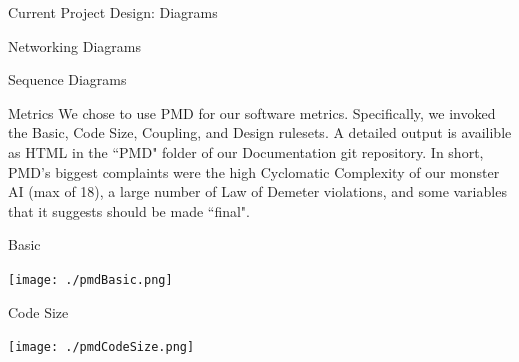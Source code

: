 \documentclass[12pt]{report}
\begin{document}
\begin{chapter}{Current Project Design: Diagrams}
\begin{section}{Networking Diagrams}
\begin{subsection}{Sequence Diagrams}
	\end{subsection}
   \end{section}
 \end{chapter}
 
  \begin{chapter}{Metrics}
  	We chose to use PMD for our software metrics. Specifically, we invoked the Basic, Code Size, Coupling, and Design rulesets. A detailed output is availible as HTML in the ``PMD" folder of our Documentation git repository. In short, PMD's biggest complaints were the high Cyclomatic Complexity of our monster AI (max of 18), a large number of Law of Demeter violations, and some variables that it suggests should be made ``final".
   \begin{section}{Basic}
   \centerline{\texttt{[image: ./pmdBasic.png]}}
   \end{section}
   \begin{section}{Code Size}
      \centerline{\texttt{[image: ./pmdCodeSize.png]}}

   \end{section}
  \end{chapter}
 
\end{document}
